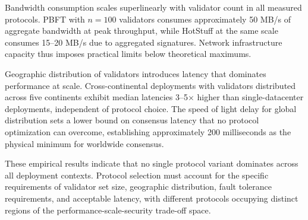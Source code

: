 Bandwidth consumption scales superlinearly with validator count in all measured protocols. PBFT with $n = 100$ validators consumes approximately 50 MB/s of aggregate bandwidth at peak throughput, while HotStuff at the same scale consumes 15--20 MB/s due to aggregated signatures. Network infrastructure capacity thus imposes practical limits below theoretical maximums.

Geographic distribution of validators introduces latency that dominates performance at scale. Cross-continental deployments with validators distributed across five continents exhibit median latencies 3--5$\times$ higher than single-datacenter deployments, independent of protocol choice. The speed of light delay for global distribution sets a lower bound on consensus latency that no protocol optimization can overcome, establishing approximately 200 milliseconds as the physical minimum for worldwide consensus.

These empirical results indicate that no single protocol variant dominates across all deployment contexts. Protocol selection must account for the specific requirements of validator set size, geographic distribution, fault tolerance requirements, and acceptable latency, with different protocols occupying distinct regions of the performance-scale-security trade-off space.